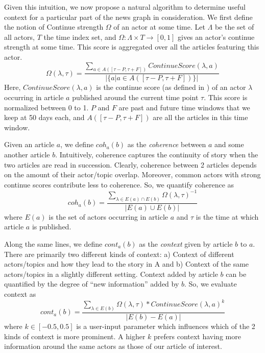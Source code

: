 Given this intuition, we now propose a natural algorithm to determine useful context for a particular part of
the news graph in consideration. We first define the notion of Continue strength $\Omega$ of an actor at some time.
Let $\Lambda$ be the set of all actors, $T$ the time index set,
and $\Omega : \Lambda \times T \rightarrow [0,1]$ gives an actor's continue strength at some time. This score is
aggregated over all the articles featuring this actor.
\begin{equation}
\Omega(\lambda, \tau) = \frac{\sum_{a \in A([\tau - P, \tau + F])}{ContinueScore(\lambda, a)}}{|\{a  | a \in A([\tau - P, \tau + F])\}|}
\end{equation}
Here, $ContinueScore(\lambda, a)$ is the continue score (as defined in \cite{choudhary@ecir2008}) of an actor $\lambda$ occurring in article $a$ published around the current time point $\tau$. This score is
normalized between 0 to 1. $P$ and $F$ are past and future time windows that we keep at 50 days each, and $A([\tau - P, \tau + F])$ are all the articles in this time window.

Given an article $a$, we define $coh_{a}(b)$ as the \emph{coherence} between $a$ and some another article $b$. Intuitively, coherence captures the continuity of story when the two articles are read in succession.
Clearly, coherence between 2 articles depends on the amount of their actor/topic overlap. Moreover, common actors with strong continue scores contribute less to coherence. So, we quantify coherence as
\begin{equation}
coh_{a}(b) = \frac{\sum_{\lambda \in E(a) \cap E(b)}{\Omega(\lambda, \tau)^{-1}}}{|E(a) \cup E(b)|}
\end{equation}
where $E(a)$ is the set of actors occurring in article $a$ and $\tau$ is the time at which article $a$ is published. 

Along the same lines, we define $cont_{a}(b)$ as the \emph{context} given by article $b$ to $a$. There are primarily two different kinds of context: a) Context of different actors/topics and how they lead
to the story in A and b) Context of the same actors/topics in a slightly different setting. Context added by article $b$ can be quantified by the degree of ``new information'' added by $b$. So, we evaluate
context as
\begin{equation}
cont_{a}(b) = \frac{\sum_{\lambda \in E(b)}{\Omega(\lambda, \tau)*ContinueScore(\lambda, a)^{k}}}{|E(b) - E(a)|}
\end{equation}
where $k \in [-0.5, 0.5]$ is a user-input parameter which influences which of the 2 kinds of context is more prominent. A higher $k$ prefers context having more information
around the same actors as those of our article of interest.

